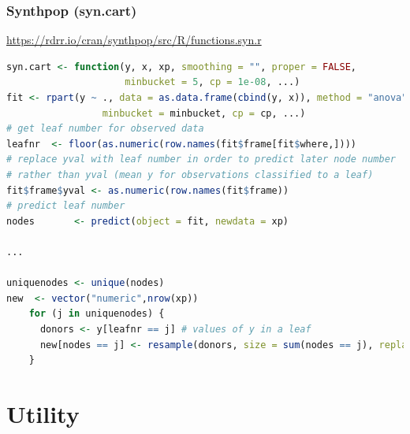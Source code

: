 \documentclass[xcolor=table]{beamer}
\begin{document}
\begin{frame}[fragile]
    \frametitle{Synthpop (syn.cart)}
    \url{https://rdrr.io/cran/synthpop/src/R/functions.syn.r}
    \begin{lstlisting}[language=R]
syn.cart <- function(y, x, xp, smoothing = "", proper = FALSE, 
                     minbucket = 5, cp = 1e-08, ...)
fit <- rpart(y ~ ., data = as.data.frame(cbind(y, x)), method = "anova",
                 minbucket = minbucket, cp = cp, ...)
# get leaf number for observed data
leafnr  <- floor(as.numeric(row.names(fit$frame[fit$where,])))
# replace yval with leaf number in order to predict later node number 
# rather than yval (mean y for observations classified to a leaf) 
fit$frame$yval <- as.numeric(row.names(fit$frame))
# predict leaf number
nodes       <- predict(object = fit, newdata = xp)

...

uniquenodes <- unique(nodes)
new  <- vector("numeric",nrow(xp))
    for (j in uniquenodes) {
      donors <- y[leafnr == j] # values of y in a leaf
      new[nodes == j] <- resample(donors, size = sum(nodes == j), replace = TRUE)
    }

    \end{lstlisting}
\end{frame}



\section{Utility}\label{sec:utility}
\end{document}
